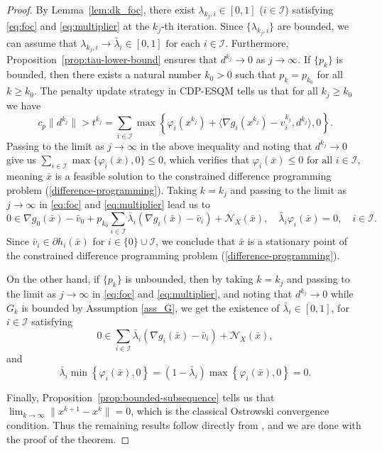 \documentclass[11pt,a4paper]{article}
\theoremstyle{plain}
\begin{document}
\begin{proof}
By Lemma~\ref{lem:dk_foc}, there {exist $\lambda_{k_j,i} \in [0, 1]$ ($i\in\mathcal I$)} satisfying \eqref{eq:foc} and \eqref{eq:multiplier} at the $k_j$-th iteration. Since ${\{\lambda_{k_j,i}\}}$ are bounded, we can assume that ${\lambda_{k_j,i} \to \bar{\lambda}_i \in [0, 1] \text{ for each } i\in\mathcal I}$. 
Furthermore, Proposition~\ref{prop:tau-lower-bound} ensures that $d^{k_j} \rightarrow 0$ as $j \rightarrow \infty$. If $\{p_k\}$ is bounded, then there exists a natural number $k_0 > 0$ such that $p_k = p_{k_0}$ for all $k \ge k_0$. The penalty update strategy in CDP-ESQM tells us that for all $k_j \ge k_0$ we have
\begin{equation}
c_p \|d^{k_j}\| > t^{k_j} = {\sum_{i\in\mathcal I} \max \left\{ \varphi_i( x^{k_j}) + \langle \nabla g_i(x^{k_j}) - v_i^{k_j}, d^{k_j} \rangle, 0 \right\}}.
\end{equation}
Passing to the limit as $j \to \infty$ in the above inequality and noting that $d^{k_j} \rightarrow 0$ give us ${\sum_{i\in\mathcal I} \max\{\varphi_i(\bar{x}), 0\} \le 0}$, which verifies that ${\varphi_i(\bar{x}) \le 0 \text{ for all } i\in\mathcal I}$, meaning $\bar{x}$ is a feasible solution to the constrained difference programming problem (\ref{difference-programming}). Taking $k = k_j$ and passing to the limit as $j \to \infty$ in \eqref{eq:foc} and \eqref{eq:multiplier} lead us to
\begin{equation*}
0 \in \nabla g_0(\bar{x}) - \bar{v}_0 
+ p_{k_0} {\sum_{i\in\mathcal I} \bar{\lambda}_i \left( \nabla g_i(\bar{x}) - \bar{v}_i \right)} + \mathcal N_X(\bar{x}),  \quad {\bar{\lambda}_i\varphi_i(\bar{x}) = 0, \quad i\in\mathcal I.}
\end{equation*}
Since $\bar{v}_i \in \partial h_i(\bar{x})$ for ${i \in \{0\} \cup  \mathcal I}$, we conclude that $\bar{x}$ is a stationary point of the constrained difference programming problem (\ref{difference-programming}).

On the other hand, if $\{p_k\}$ is unbounded, then by taking $k = k_j$ and passing to the limit as \( j \to \infty \) in \eqref{eq:foc} and \eqref{eq:multiplier}, and noting that $d^{k_j} \rightarrow 0$ while $G_k$ is bounded by Assumption \ref{ass_G}, we get the existence of $\bar{\lambda}_i \in [0,1]$, for $i\in\mathcal{I}$ satisfying
\[
 0 \in \sum_{i\in\mathcal{I}} \bar{\lambda}_i \left( \nabla g_i(\bar{x}) - \bar{v}_i \right) + \mathcal N_X(\bar{x}),
\]
and 
\[
\bar{\lambda}_i \min\left\{ \varphi_i(\bar{x}), 0 \right\}=(1- \bar{\lambda}_i)\max\left\{ \varphi_i(\bar{x}) , 0 \right\} =0.
\]


Finally, Proposition~\ref{prop:bounded-subsequence} tells us that $\lim_{k \to \infty}\|x^{k+1} - x^k\| = 0$, which is the classical Ostrowski convergence condition. Thus the remaining results follow directly from \cite[Theorem~8.3.9 and Proposition~8.3.10]{FacchineiPang2003}, and we are done with the proof of the theorem.
\end{proof}\vspace*{0.05in}
\end{document}
